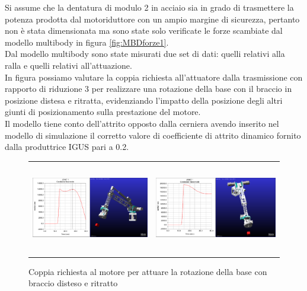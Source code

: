 \documentclass[%
corpo=11pt,
twoside,
 stile=classica,
oldstyle,
greek,%
]{toptesi}
\begin{document}
		Si assume che la dentatura di modulo 2 in acciaio sia in grado di trasmettere la potenza prodotta dal motoriduttore con un ampio margine di sicurezza, pertanto non è stata dimensionata ma sono state solo verificate le forze scambiate dal modello multibody in figura \ref{fig:MBDforze1}. \\
		Dal modello multibody sono state misurati due set di dati: quelli relativi alla ralla e quelli relativi all'attuazione. \\
		In figura possiamo valutare la coppia richiesta all'attuatore dalla trasmissione con rapporto di riduzione 3 per realizzare una rotazione della base con il braccio in posizione distesa e ritratta, evidenziando l'impatto della posizione degli altri giunti di posizionamento sulla prestazione del motore. \\
		Il modello tiene conto dell'attrito opposto dalla cerniera avendo inserito nel modello di simulazione il corretto valore di coefficiente di attrito dinamico fornito dalla produttrice IGUS pari a 0.2. 

		\begin{figure} [!ht]
			\centering
			\begin{tabular}{ll}
				\includegraphics[height=4cm,keepaspectratio]{Plots/BASE/joint1_FAVOREVOLE.png}
				&
				\includegraphics[height=4cm,keepaspectratio]{Plots/BASE/joint1_sfavorevole.png}
			\end{tabular}
			\caption{Coppia richiesta al motore per attuare la rotazione della base con braccio disteso e ritratto}
			\label{fig:MBDcoppia1}
		\end{figure}
	
\end{document}
